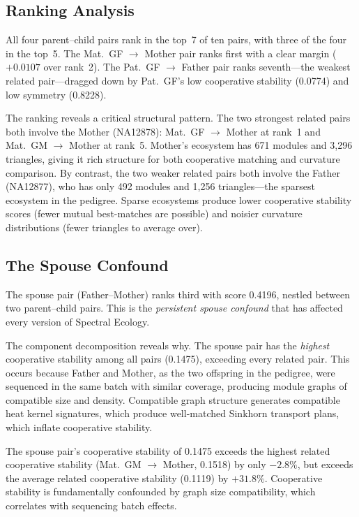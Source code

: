 \documentclass{../yalumba}
\begin{document}
\subsection{Ranking Analysis}

\begin{keyfinding}
All four parent--child pairs rank in the top~7 of ten pairs, with three
of the four in the top~5.  The Mat.~GF $\to$ Mother pair ranks first
with a clear margin ($+0.0107$ over rank~2).  The Pat.~GF $\to$ Father
pair ranks seventh---the weakest related pair---dragged down by Pat.~GF's
low cooperative stability (0.0774) and low symmetry (0.8228).
\end{keyfinding}

The ranking reveals a critical structural pattern.  The two strongest
related pairs both involve the Mother (NA12878): Mat.~GF $\to$ Mother at
rank~1 and Mat.~GM $\to$ Mother at rank~5.  Mother's ecosystem has 671
modules and 3{,}296 triangles, giving it rich structure for both
cooperative matching and curvature comparison.  By contrast, the two
weaker related pairs both involve the Father (NA12877), who has only
492 modules and 1{,}256 triangles---the sparsest ecosystem in the
pedigree.  Sparse ecosystems produce lower cooperative stability scores
(fewer mutual best-matches are possible) and noisier curvature
distributions (fewer triangles to average over).

\subsection{The Spouse Confound}

The spouse pair (Father--Mother) ranks third with score 0.4196, nestled
between two parent--child pairs.  This is the \emph{persistent spouse
confound} that has affected every version of Spectral Ecology.

The component decomposition reveals why.  The spouse pair has the
\emph{highest} cooperative stability among all pairs (0.1475), exceeding
every related pair.  This occurs because Father and Mother, as the two
offspring in the pedigree, were sequenced in the same batch with similar
coverage, producing module graphs of compatible size and density.
Compatible graph structure generates compatible heat kernel signatures,
which produce well-matched Sinkhorn transport plans, which inflate
cooperative stability.

\begin{limitation}
The spouse pair's cooperative stability of 0.1475 exceeds the highest
related cooperative stability (Mat.~GM $\to$ Mother, 0.1518) by only
$-2.8\%$, but exceeds the average related cooperative stability (0.1119)
by $+31.8\%$.  Cooperative stability is fundamentally confounded by graph
size compatibility, which correlates with sequencing batch effects.
\end{limitation}
\end{document}
